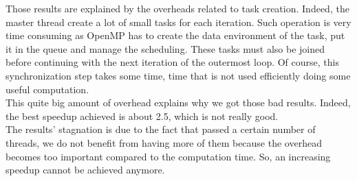 Those results are explained by the overheads related to task creation. Indeed, the master thread create a lot of small tasks for each iteration. Such operation is very time consuming as OpenMP has to create the data environment of the task, put it in the queue and manage the scheduling.  These tasks must also be joined before continuing with the next iteration of the outermost loop. Of course, this synchronization step takes some time, time that is not used efficiently doing some useful computation.\\

This quite big amount of overhead explains why we got those bad results. Indeed, the best speedup achieved is about 2.5, which is not really good.\\

The results' stagnation is due to the fact that passed a certain number of threads, we do not benefit from having more of them because the overhead becomes too important compared to the computation time. So, an increasing speedup cannot be achieved anymore.
